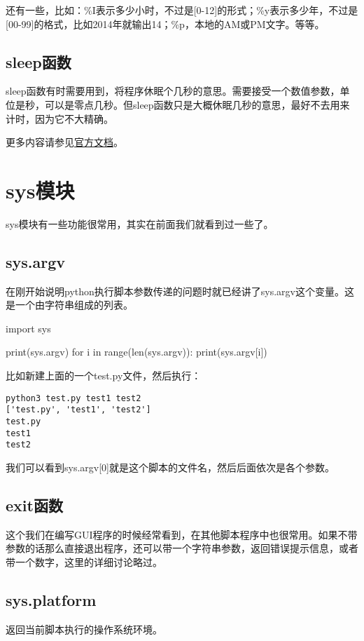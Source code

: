\documentclass[12pt,oneside]{book}
\begin{document}
\begin{common-format}
还有一些，比如：\%{}I表示多少小时，不过是[0-12]的形式；\%{}y表示多少年，不过是[00-99]的格式，比如2014年就输出14；\%{}p，本地的AM或PM文字。等等。


\section{sleep函数 }
sleep函数有时需要用到，将程序休眠个几秒的意思。需要接受一个数值参数，单位是秒，可以是零点几秒。但sleep函数只是大概休眠几秒的意思，最好不去用来计时，因为它不大精确。



\begin{large}
更多内容请参见\href{https://docs.python.org/3/library/time.html}{官方文档}。
\end{large}


\chapter{sys模块}
sys模块有一些功能很常用，其实在前面我们就看到过一些了。

\section{sys.argv}
在刚开始说明python执行脚本参数传递的问题时就已经讲了sys.argv这个变量。这是一个由字符串组成的列表。
\begin{tcbpython}
import sys

print(sys.argv)
for i in range(len(sys.argv)):
    print(sys.argv[i])
\end{tcbpython}
比如新建上面的一个test.py文件，然后执行：
\begin{Verbatim}
python3 test.py test1 test2
['test.py', 'test1', 'test2']
test.py
test1
test2
\end{Verbatim}
我们可以看到sys.argv[0]就是这个脚本的文件名，然后后面依次是各个参数。

\section{exit函数}
这个我们在编写GUI程序的时候经常看到，在其他脚本程序中也很常用。如果不带参数的话那么直接退出程序，还可以带一个字符串参数，返回错误提示信息，或者带一个数字，这里的详细讨论略过。


\section{sys.platform}
返回当前脚本执行的操作系统环境。


\end{common-format}
\end{document}
